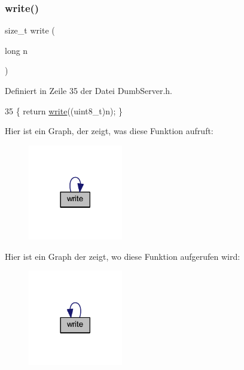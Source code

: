 \subsubsection{\texorpdfstring{write()}{write()}\hspace{0.1cm}{\footnotesize\ttfamily [4/6]}}
{\footnotesize\ttfamily size\+\_\+t write (\begin{DoxyParamCaption}\item[{long}]{n }\end{DoxyParamCaption})\hspace{0.3cm}{\ttfamily [inline]}}



Definiert in Zeile 35 der Datei Dumb\+Server.\+h.


\begin{DoxyCode}
35 \{ \textcolor{keywordflow}{return} \hyperlink{class_esp_server_a7c66fc8d559f4956d4ccea196299bca7}{write}((uint8\_t)n); \}
\end{DoxyCode}
Hier ist ein Graph, der zeigt, was diese Funktion aufruft\+:\nopagebreak
\begin{figure}[H]
\begin{center}
\leavevmode
\includegraphics[width=117pt]{class_esp_server_a3cfec102ee6f58a2f7e617999ce9f5bb_cgraph}
\end{center}
\end{figure}
Hier ist ein Graph der zeigt, wo diese Funktion aufgerufen wird\+:\nopagebreak
\begin{figure}[H]
\begin{center}
\leavevmode
\includegraphics[width=117pt]{class_esp_server_a3cfec102ee6f58a2f7e617999ce9f5bb_icgraph}
\end{center}
\end{figure}
\mbox{\label{class_esp_server_a2d9bc6ac05e45a7023be3cd1ca224407}} 
